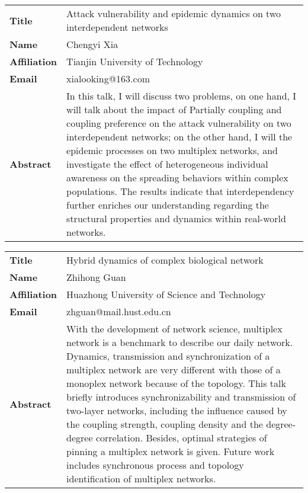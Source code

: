 \documentclass[oneside,A4paper,12pt]{article}
\begin{document}
\newpage
\begin{longtable}{p{2cm}p{14cm}}
\toprule
\textbf{Title} & Attack vulnerability and epidemic dynamics on two interdependent networks\\
\textbf{Name} & Chengyi Xia\\
\textbf{Affiliation} & Tianjin University of Technology\\
\textbf{Email} & xialooking@163.com\\
\textbf{Abstract} & In this talk, I will discuss two problems, on one hand, I will talk about the impact of Partially coupling and coupling preference on the attack vulnerability on two interdependent networks; on the other hand, I will the epidemic processes on two multiplex networks, and investigate the effect of heterogeneous individual awareness on the spreading behaviors within complex populations. The results indicate that interdependency further enriches our understanding regarding the structural properties and dynamics within real-world networks.\\
\bottomrule
\end{longtable}

\newpage
\begin{longtable}{p{2cm}p{14cm}}
\toprule
\textbf{Title} & Hybrid dynamics of complex biological network\\
\textbf{Name} & Zhihong Guan\\
\textbf{Affiliation} & Huazhong University of Science and Technology\\
\textbf{Email} & zhguan@mail.hust.edu.cn\\
\textbf{Abstract} & With the development of network science, multiplex network is a benchmark to describe our daily network. Dynamics, transmission and synchronization of a multiplex network are very different with those of a monoplex network because of the topology. This talk briefly introduces synchronizability and transmission of two-layer networks, including the influence caused by the coupling strength, coupling density and the degree-degree correlation. Besides, optimal strategies of pinning a multiplex network is given. Future work includes synchronous process and topology identification of multiplex networks.\\
\bottomrule
\end{longtable}
\end{document}
